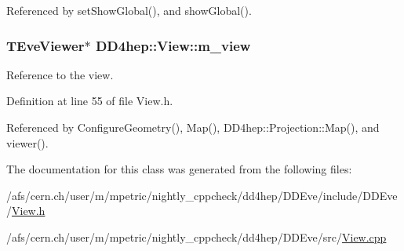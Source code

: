 Referenced by setShowGlobal(), and showGlobal().\hypertarget{class_d_d4hep_1_1_view_a6792e4acf7d115519d5390959e7c0306}{
\subsubsection[{m\_\-view}]{\setlength{\rightskip}{0pt plus 5cm}TEveViewer$\ast$ {\bf DD4hep::View::m\_\-view}}}
\label{class_d_d4hep_1_1_view_a6792e4acf7d115519d5390959e7c0306}


Reference to the view. 

Definition at line 55 of file View.h.

Referenced by ConfigureGeometry(), Map(), DD4hep::Projection::Map(), and viewer().

The documentation for this class was generated from the following files:\begin{DoxyCompactItemize}
\item 
/afs/cern.ch/user/m/mpetric/nightly\_\-cppcheck/dd4hep/DDEve/include/DDEve/\hyperlink{_view_8h}{View.h}\item 
/afs/cern.ch/user/m/mpetric/nightly\_\-cppcheck/dd4hep/DDEve/src/\hyperlink{_view_8cpp}{View.cpp}\end{DoxyCompactItemize}
